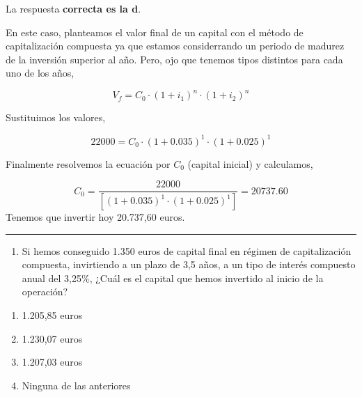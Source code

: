 \documentclass[
  letterpaper,
  DIV=11,
  numbers=noendperiod]{scrreprt}
\providecommand{\tightlist}{%
  \setlength{\itemsep}{0pt}\setlength{\parskip}{0pt}}\usepackage{longtable,booktabs,array}
\begin{document}
\begin{tcolorbox}[enhanced jigsaw, left=2mm, opacityback=0, colback=white, breakable, arc=.35mm, bottomrule=.15mm, rightrule=.15mm, toprule=.15mm, leftrule=.75mm, colframe=quarto-callout-tip-color-frame]
\begin{minipage}[t]{5.5mm}
\textcolor{quarto-callout-tip-color}{\faLightbulb}
\end{minipage}%
\begin{minipage}[t]{\textwidth - 5.5mm}

La respuesta \textbf{correcta es la d}.

En este caso, planteamos el valor final de un capital con el método de
capitalización compuesta ya que estamos considerrando un periodo de
madurez de la inversión superior al año. Pero, ojo que tenemos tipos
distintos para cada uno de los años,

\[V_f=C_0\cdot\left(1+i_1\right)^n\cdot\left(1+i_2\right)^n\]

Sustituimos los valores,

\[22000=C_0\cdot\left(1+0.035\right)^1\cdot\left(1+0.025\right)^1\]

Finalmente resolvemos la ecuación por \(C_0\) (capital inicial) y
calculamos,

\[C_0=\frac{22000}{\left[\left(1+0.035\right)^1\cdot\left(1+0.025\right)^1\right]}=20737.60\]
Tenemos que invertir hoy 20.737,60 euros.

\end{minipage}%
\end{tcolorbox}

\begin{center}\rule{0.5\linewidth}{0.5pt}\end{center}

\begin{enumerate}
\def\labelenumi{\arabic{enumi}.}
\setcounter{enumi}{9}
\tightlist
\item
  Si hemos conseguido 1.350 euros de capital final en régimen de
  capitalización compuesta, invirtiendo a un plazo de 3,5 años, a un
  tipo de interés compuesto anual del 3,25\%, ¿Cuál es el capital que
  hemos invertido al inicio de la operación?
\end{enumerate}

\begin{enumerate}
\def\labelenumi{\alph{enumi})}
\item
  1.205,85 euros
\item
  1.230,07 euros
\item
  1.207,03 euros
\item
  Ninguna de las anteriores
\end{enumerate}
\end{document}
